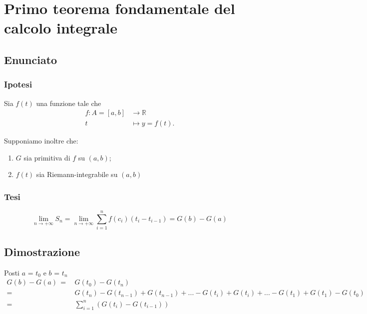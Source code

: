 \documentclass[../../dimostrazioni]{subfiles}
\begin{document}
    \chapter{Primo teorema fondamentale del calcolo integrale}
    \label{teoFondCalcoloIntegrale1}

        \section*{Enunciato}

            \subsection*{Ipotesi}

                Sia \(f(t)\) una funzione tale che
                \begin{align*}
                    f : A = [a, b] &\longrightarrow \mathbb{R}\\
                    t &\longmapsto y = f(t).
                \end{align*}

                Supponiamo inoltre che:

                \begin{enumerate}
                    \indentitem \item \(G\) sia primitiva di \(f\) su \((a, b)\);
                    \indentitem \item \(f(t)\) sia Riemann-integrabile su \((a, b)\)
                \end{enumerate}

            \subsection*{Tesi}

                \[\lim_{n\to +\infty} {S_n} = \lim_{n\to +\infty} {\sum_{i=1}^{n} f(c_i)({t_i} - t_{i-1})} = G(b) - G(a) \]

        \section*{Dimostrazione}

                Posti \(a\) = \(t_0\) e \(b\) = \(t_n\)
                \begin{align*}
                    G(b) - G(a) \, =& \, G(t_0) - G(t_n) \\
                    =& \, G(t_n) - G(t_{n-1}) + G(t_{n-1}) + ... - G(t_i) + G(t_i) + ... - G(t_1) + G(t_1) - G(t_0) \\
                    =& \, \sum_{i=1}^n (G(t_i) - G(t_{i-1}))
                \end{align*}
\end{document}
